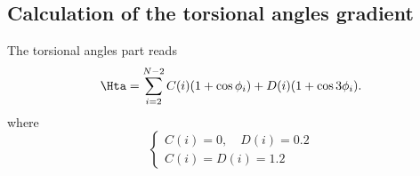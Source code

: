 


\subsection{Calculation of the torsional angles gradient}

The torsional angles part reads
\begin{equation}
  \Hta=\sum_{i=2}^{N-2} C(i)(1+\cos\phi_i)+D(i)(1+\cos{3\phi_i}).
  \label{ta}
\end{equation}
where
\begin{equation}
\begin{cases}
 C(i)=0,\quad D(i)=0.2\\
 C(i)=D(i)=1.2
\end{cases}
  \label{def-cd}
\end{equation}
